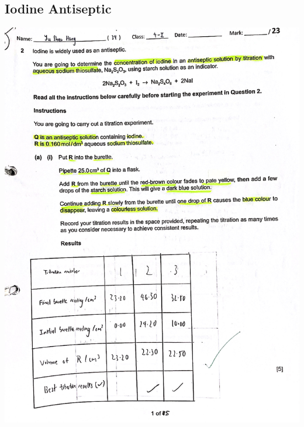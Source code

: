 \documentclass[oneside]{book}
\begin{document}
\subsection{Iodine Antiseptic }
\begin{center}
    \includegraphics[width=\textwidth,height=\textheight,keepaspectratio]{images/3485CD0D-0FC4-454A-921C-FCD39763EFCE.jpeg}\\

\end{center}
\end{document}
